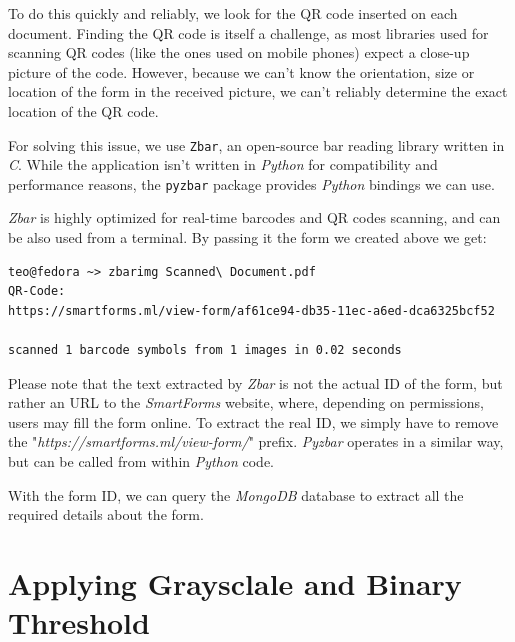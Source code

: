 \documentclass[12pt, a4paper]{report}
\def\code#1{\texttt{#1}}
\begin{document}
To do this quickly and reliably, we look for the QR code inserted on each document. Finding the QR code is itself a challenge, as most libraries used for scanning QR codes (like the ones used on mobile phones) expect a close-up picture of the code. However, because we can't know the orientation, size or location of the form in the received picture, we can't reliably determine the exact location of the QR code.

For solving this issue, we use \code{Zbar}, an open-source bar reading library written in \textit{C}. While the application isn't written in \textit{Python} for compatibility and performance reasons, the \code{pyzbar} package provides \textit{Python} bindings we can use.

\textit{Zbar} is highly optimized for real-time barcodes and QR codes scanning, and can be also used from a terminal. By passing it the form we created above we get:


\begin{verbatim}
teo@fedora ~> zbarimg Scanned\ Document.pdf 
QR-Code:
https://smartforms.ml/view-form/af61ce94-db35-11ec-a6ed-dca6325bcf52

scanned 1 barcode symbols from 1 images in 0.02 seconds
\end{verbatim}

Please note that the text extracted by \textit{Zbar} is not the actual ID of the form, but rather an URL to the \textit{SmartForms} website, where, depending on permissions, users may fill the form online. To extract the real ID, we simply have to remove the "\textit{https://smartforms.ml/view-form/}" prefix. \textit{Pyzbar} operates in a similar way, but can be called from within \textit{Python} code.

With the form ID, we can query the \textit{MongoDB} database to extract all the required details about the form.

\section{Applying Graysclale and Binary Threshold}
\end{document}
